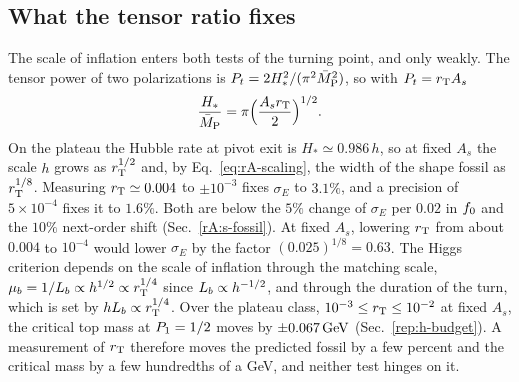 \subsection{What the tensor ratio fixes}
\label{rA:c-scale}

The scale of inflation enters both tests of the turning point, and only weakly.
The tensor power of two polarizations is $P_t=2H_*^2/(\pi^2\bar M_{\mathrm{P}}^2)$, so with $P_t=r_{\mathrm{T}} A_s$
\begin{equation}
\frac{H_*}{\bar M_{\mathrm{P}}}=\pi\Big(\frac{A_sr_{\mathrm{T}}}{2}\Big)^{1/2}.
\end{equation}
On the plateau the Hubble rate at pivot exit is $H_*\simeq0.986\,h$, so at fixed $A_s$ the scale $h$ grows as $r_{\mathrm{T}}^{1/2}$ and, by Eq.~\eqref{eq:rA-scaling}, the width of the shape fossil as $r_{\mathrm{T}}^{1/8}$. %
Measuring $r_{\mathrm{T}}\simeq0.004$ to $\pm10^{-3}$ fixes $\sigma_E$ to $3.1\%$, and a precision of $5\times10^{-4}$ fixes it to $1.6\%$. %
Both are below the $5\%$ change of $\sigma_E$ per $0.02$ in $f_0$ and the $10\%$ next-order shift (Sec.~\ref{rA:s-fossil}). %
At fixed $A_s$, lowering $r_{\mathrm{T}}$ from about $0.004$ to $10^{-4}$ would lower $\sigma_E$ by the factor $(0.025)^{1/8}=0.63$. %
The Higgs criterion depends on the scale of inflation through the matching scale, $\mu_b=1/L_b\propto h^{1/2}\propto r_{\mathrm{T}}^{1/4}$ since $L_b\propto h^{-1/2}$, and through the duration of the turn, which is set by $hL_b\propto r_{\mathrm{T}}^{1/4}$. %
Over the plateau class, $10^{-3}\leq r_{\mathrm{T}}\leq10^{-2}$ at fixed $A_s$, the critical top mass at $P_1=1/2$ moves by $\pm0.067\,\mathrm{GeV}$ (Sec.~\ref{rep:h-budget}). %
A measurement of $r_{\mathrm{T}}$ therefore moves the predicted fossil by a few percent and the critical mass by a few hundredths of a GeV, and neither test hinges on it.
